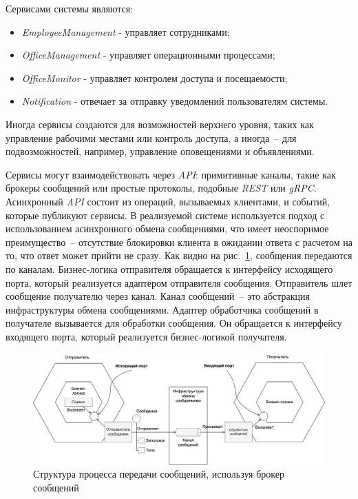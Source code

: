 Сервисами системы являются:

\label{page:system-design:architectural-pattern-design:microservices-list}
\begin{itemize}
    \item \textit{EmployeeManagement} - управляет сотрудниками;
    \item \textit{OfficeManagement} - управляет операционными процессами;
    \item \textit{OfficeMonitor} - управляет контролем доступа и посещаемости;
    \item \textit{Notification} - отвечает за отправку уведомлений пользователям системы.
\end{itemize}

Иногда сервисы создаются для возможностей верхнего уровня, таких как управление рабочими местами или контроль доступа, а иногда~-- для подвозможностей, например, управление оповещениями и объявлениями.

Сервисы могут взаимодействовать через \textit{API}: примитивные каналы, такие как брокеры сообщений или простые протоколы, подобные \textit{REST} или \textit{gRPC}. Асинхронный \textit{API} состоит из операций, вызываемых клиентами, и событий, которые публикуют сервисы. В реализуемой системе используется подход с использованием асинхронного обмена сообщениями, что имеет неоспоримое преимущество~-- отсутствие блокировки клиента в ожидании ответа с расчетом на то, что ответ может прийти не сразу. Как видно на рис.~\ref{fig:microservices-broker-messaging}, сообщения передаются по каналам. Бизнес-логика отправителя обращается к интерфейсу исходящего порта, который реализуется адаптером отправителя сообщения. Отправитель шлет сообщение получателю через канал. Канал сообщений~-- это абстракция инфраструктуры обмена сообщениями. Адаптер обработчика сообщений в получателе вызывается для обработки сообщения. Он обращается к интерфейсу входящего порта, который реализуется бизнес-логикой получателя.

\begin{figure}[h]
\centering
    \includegraphics[width=1\linewidth]{assets/microservices-broker-messaging.png}
    \caption{Структура процесса передачи сообщений, используя брокер сообщений}
    \label{fig:microservices-broker-messaging}
\end{figure}

